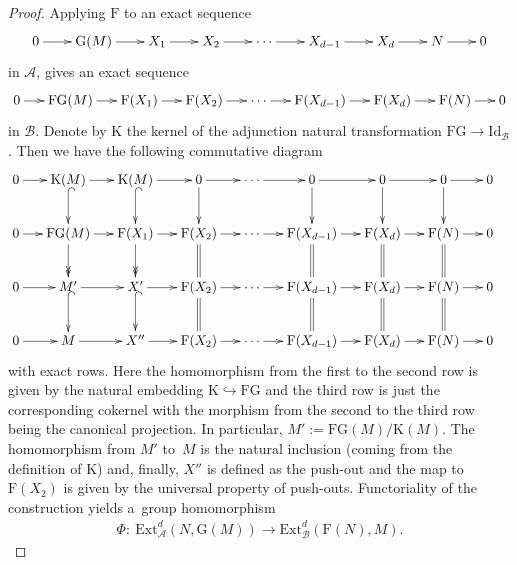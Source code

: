 \documentclass[11pt]{article}
\begin{document}
\begin{proof}
Applying $\mathrm{F}$ to an exact sequence
\begin{gather*}
\xymatrix@C=7mm{
0\ar[r]&\mathrm{G}(M)\ar[r]&X_1\ar[r]&X_2\ar[r]&\cdots\ar[r]&X_{d-1}\ar[r]&X_d\ar[r]&N\ar[r]&0
}
\end{gather*}
in $\mathcal{A}$, gives an exact sequence
\begin{gather*}
\xymatrix@C=5mm{
0\ar[r]&\mathrm{F}\mathrm{G}(M)\ar[r]&\mathrm{F}(X_1)\ar[r]&
\mathrm{F}(X_2)\ar[r]&\cdots\ar[r]&\mathrm{F}(X_{d-1})\ar[r]&\mathrm{F}(X_d)\ar[r]&\mathrm{F}(N)\ar[r]&0
}
\end{gather*}
in $\mathcal{B}$.
Denote by $\mathrm{K}$ the kernel of the adjunction natural transformation $\mathrm{F}\mathrm{G}\to
\mathrm{Id}_{\mathcal{B}}$.
Then we have the following commutative diagram
\begin{gather}
\label{eq11}
\begin{split}
& \xymatrix@C=5mm{
0\ar[r]&\mathrm{K}(M)\ar[r]\ar@{^{(}->}[d]&\mathrm{K}(M)\ar[r]\ar@{^{(}->}[d]&
0\ar[d]\ar[r]&\cdots\ar[r]&0\ar[d]\ar[r]&0\ar[d]\ar[r]&0\ar[d]\ar[r]&0\\
0\ar[r]&\mathrm{F}\mathrm{G}(M)\ar[r]\ar@{->>}[d]&\mathrm{F}(X_1)\ar[r]\ar@{->>}[d]&
\mathrm{F}(X_2)\ar[r]\ar@{=}[d]&\cdots\ar[r]&\mathrm{F}(X_{d-1})\ar[r]\ar@{=}[d]&
\mathrm{F}(X_d)\ar[r]\ar@{=}[d]&\mathrm{F}(N)\ar[r]\ar@{=}[d]&0\\
0\ar[r]&M'\ar[r]\ar@{^{(}->}[d]&X'\ar[r]\ar@{^{(}->}[d]&
\mathrm{F}(X_2)\ar[r]\ar@{=}[d]&\cdots\ar[r]&\mathrm{F}(X_{d-1})\ar[r]\ar@{=}[d]&
\mathrm{F}(X_d)\ar[r]\ar@{=}[d]&\mathrm{F}(N)\ar[r]\ar@{=}[d]&0\\
0\ar[r]&M\ar[r]&X''\ar[r]&
\mathrm{F}(X_2)\ar[r]&\cdots\ar[r]&\mathrm{F}(X_{d-1})\ar[r]&\mathrm{F}(X_d)\ar[r]&\mathrm{F}(N)\ar[r]&0
}
\end{split}
\end{gather}
with exact rows.
Here the homomorphism from the f\/irst to the second row is given by the natural embedding $\mathrm{K}\hookrightarrow
\mathrm{F}\mathrm{G}$ and the third row is just the corresponding cokernel with the morphism from the second to the
third row being the canonical projection.
In particular, $M':=\mathrm{F}\mathrm{G}(M)/\mathrm{K}(M)$.
The homomorphism from $M'$ to~$M$ is the natural inclusion (coming from the def\/inition of $\mathrm{K}$) and, f\/inally,
$X''$ is def\/ined as the push-out and the map to $\mathrm{F}(X_2)$ is given by the universal property of push-outs.
Functoriality of the construction yields a~group homomorphism
\begin{gather*}
\Phi: \ \mathrm{Ext}^d_{\mathcal{A}}(N,\mathrm{G}(M))\to \mathrm{Ext}^d_{\mathcal{B}}(\mathrm{F}(N),M).
\end{gather*}


\end{proof}
\end{document}
